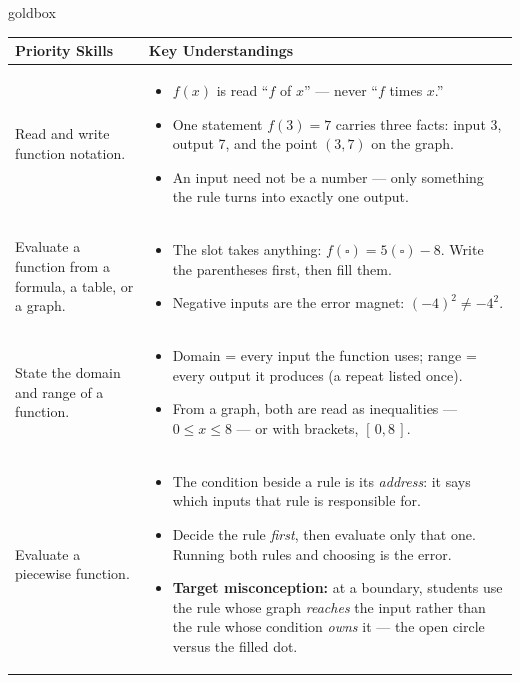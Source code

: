 \documentclass[10pt]{article}
\begin{document}
\renewcommand{\arraystretch}{1.6}
\begin{skillbox}{goldbox}
\begin{tabularx}{\linewidth}{@{}X X@{}}
\textbf{Priority Skills} &
\textbf{Key Understandings} \\
\midrule
Read and write function notation. &
\begin{itemize}[leftmargin=1.2em,itemsep=2pt,topsep=0pt]
  \item $f(x)$ is read ``$f$ of $x$'' --- never ``$f$ times $x$.''
  \item One statement $f(3) = 7$ carries three facts: input 3, output 7,
        and the point $(3, 7)$ on the graph.
  \item An input need not be a number --- only something the rule turns into
        exactly one output.
\end{itemize} \\
Evaluate a function from a formula, a table, or a graph. &
\begin{itemize}[leftmargin=1.2em,itemsep=2pt,topsep=0pt]
  \item The slot takes anything: $f(\square) = 5(\square) - 8$. Write the
        parentheses first, then fill them.
  \item Negative inputs are the error magnet: $(-4)^2 \ne -4^2$.
\end{itemize} \\
State the domain and range of a function. &
\begin{itemize}[leftmargin=1.2em,itemsep=2pt,topsep=0pt]
  \item Domain = every input the function uses; range = every output it
        produces (a repeat listed once).
  \item From a graph, both are read as inequalities --- $0 \le x \le 8$ --- or
        with brackets, $[\,0, 8\,]$.
\end{itemize} \\
Evaluate a piecewise function. &
\begin{itemize}[leftmargin=1.2em,itemsep=2pt,topsep=0pt]
  \item The condition beside a rule is its \textit{address}: it says which
        inputs that rule is responsible for.
  \item Decide the rule \textit{first}, then evaluate only that one. Running
        both rules and choosing is the error.
  \item \textbf{Target misconception:} at a boundary, students use the rule
        whose graph \textit{reaches} the input rather than the rule whose
        condition \textit{owns} it --- the open circle versus the filled dot.
\end{itemize} \\
\end{tabularx}
\end{skillbox}
\end{document}
